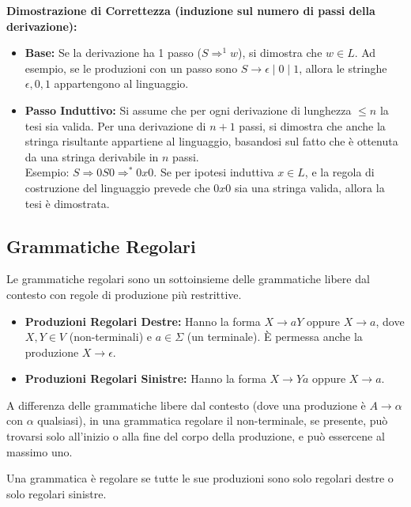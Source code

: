 \vspace{0.1 cm}
\textbf{Dimostrazione di Correttezza (induzione sul numero di passi della derivazione):}
\begin{itemize}
    \item \textbf{Base:} Se la derivazione ha 1 passo ($S \Rightarrow^1 w$), si dimostra che $w \in L$. Ad esempio, se le produzioni con un passo sono $S \rightarrow \epsilon \mid 0 \mid 1$, allora le stringhe $\epsilon, 0, 1$ appartengono al linguaggio.
    
    \item \textbf{Passo Induttivo:} Si assume che per ogni derivazione di lunghezza $\le n$ la tesi sia valida. Per una derivazione di $n+1$ passi, si dimostra che anche la stringa risultante appartiene al linguaggio, basandosi sul fatto che è ottenuta da una stringa derivabile in $n$ passi. \\
    Esempio: $S \Rightarrow 0S0 \Rightarrow^* 0x0$. Se per ipotesi induttiva $x \in L$, e la regola di costruzione del linguaggio prevede che $0x0$ sia una stringa valida, allora la tesi è dimostrata.
\end{itemize}


\subsection{Grammatiche Regolari}

Le grammatiche regolari sono un sottoinsieme delle grammatiche libere dal contesto con regole di produzione più restrittive.

\begin{itemize}
    \item \textbf{Produzioni Regolari Destre:} Hanno la forma $X \rightarrow aY$ oppure $X \rightarrow a$, dove $X, Y \in V$ (non-terminali) e $a \in \Sigma$ (un terminale). È permessa anche la produzione $X \rightarrow \epsilon$.
    
    \item \textbf{Produzioni Regolari Sinistre:} Hanno la forma $X \rightarrow Ya$ oppure $X \rightarrow a$.
\end{itemize}

A differenza delle grammatiche libere dal contesto (dove una produzione è $A \rightarrow \alpha$ con $\alpha$ qualsiasi), in una grammatica regolare il non-terminale, se presente, può trovarsi solo all'inizio o alla fine del corpo della produzione, e può essercene al massimo uno.

Una grammatica è regolare se tutte le sue produzioni sono solo regolari destre o solo regolari sinistre.

